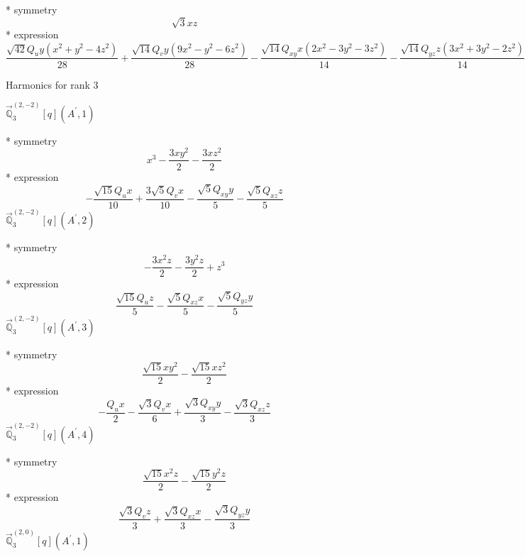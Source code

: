\documentclass[fleqn,8pt]{jsarticle}
\begin{document}
\noindent\quad ** symmetry
\begin{dmath*}
\sqrt{3} x z
\end{dmath*}
\noindent\quad ** expression
\begin{dmath*}
\frac{\sqrt{42} Q_{u} y \left(x^{2} + y^{2} - 4 z^{2}\right)}{28} + \frac{\sqrt{14} Q_{v} y \left(9 x^{2} - y^{2} - 6 z^{2}\right)}{28} - \frac{\sqrt{14} Q_{xy} x \left(2 x^{2} - 3 y^{2} - 3 z^{2}\right)}{14} - \frac{\sqrt{14} Q_{yz} z \left(3 x^{2} + 3 y^{2} - 2 z^{2}\right)}{14}
\end{dmath*}

\noindent * Harmonics for rank 3

\noindent\quad $\vec{\mathbb{Q}}_{3}^{(2,-2)}[q](A^{\prime},1)$

\noindent\quad ** symmetry
\begin{dmath*}
x^{3} - \frac{3 x y^{2}}{2} - \frac{3 x z^{2}}{2}
\end{dmath*}
\noindent\quad ** expression
\begin{dmath*}
- \frac{\sqrt{15} Q_{u} x}{10} + \frac{3 \sqrt{5} Q_{v} x}{10} - \frac{\sqrt{5} Q_{xy} y}{5} - \frac{\sqrt{5} Q_{xz} z}{5}
\end{dmath*}
\noindent\quad $\vec{\mathbb{Q}}_{3}^{(2,-2)}[q](A^{\prime},2)$

\noindent\quad ** symmetry
\begin{dmath*}
- \frac{3 x^{2} z}{2} - \frac{3 y^{2} z}{2} + z^{3}
\end{dmath*}
\noindent\quad ** expression
\begin{dmath*}
\frac{\sqrt{15} Q_{u} z}{5} - \frac{\sqrt{5} Q_{xz} x}{5} - \frac{\sqrt{5} Q_{yz} y}{5}
\end{dmath*}
\noindent\quad $\vec{\mathbb{Q}}_{3}^{(2,-2)}[q](A^{\prime},3)$

\noindent\quad ** symmetry
\begin{dmath*}
\frac{\sqrt{15} x y^{2}}{2} - \frac{\sqrt{15} x z^{2}}{2}
\end{dmath*}
\noindent\quad ** expression
\begin{dmath*}
- \frac{Q_{u} x}{2} - \frac{\sqrt{3} Q_{v} x}{6} + \frac{\sqrt{3} Q_{xy} y}{3} - \frac{\sqrt{3} Q_{xz} z}{3}
\end{dmath*}
\noindent\quad $\vec{\mathbb{Q}}_{3}^{(2,-2)}[q](A^{\prime},4)$

\noindent\quad ** symmetry
\begin{dmath*}
\frac{\sqrt{15} x^{2} z}{2} - \frac{\sqrt{15} y^{2} z}{2}
\end{dmath*}
\noindent\quad ** expression
\begin{dmath*}
\frac{\sqrt{3} Q_{v} z}{3} + \frac{\sqrt{3} Q_{xz} x}{3} - \frac{\sqrt{3} Q_{yz} y}{3}
\end{dmath*}
\noindent\quad $\vec{\mathbb{Q}}_{3}^{(2,0)}[q](A^{\prime},1)$
\end{document}
